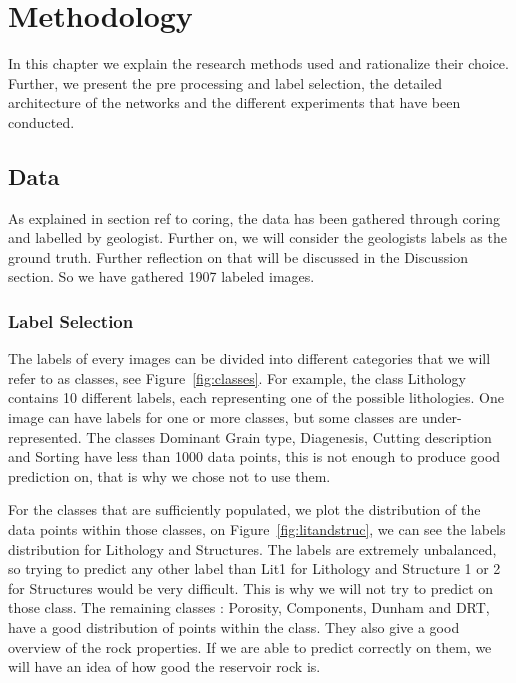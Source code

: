 \chapter{Methodology}\label{chp:methodology}
In this chapter we explain the research methods used and rationalize their choice. Further, we present the pre processing and label selection, the detailed architecture of the networks and the different experiments that have been conducted. 
\section{Data}

As explained in section ref to coring, the data has been gathered through coring and labelled by geologist. Further on, we will consider the geologists labels as the ground truth. Further reflection on that will be discussed in the Discussion section. So we have gathered 1907 labeled images. 
\subsection{Label Selection}
 The labels of every images can be divided into different categories that we will refer to as classes, see Figure~\ref{fig:classes}. For example, the class Lithology contains 10 different labels, each representing one of the possible lithologies. One image can have labels for one or more classes, but some classes are under-represented. The classes Dominant Grain type, Diagenesis, Cutting description and Sorting have less than 1000 data points, this is not enough to produce good prediction on, that is why we chose not to use them.
 
 For the classes that are sufficiently populated, we plot the distribution of the data points within those classes, on Figure~\ref{fig:litandstruc}, we can see the labels distribution for Lithology and Structures. The labels are extremely unbalanced, so trying to predict any other label than Lit1 for Lithology and Structure 1 or 2 for Structures would be very difficult. This is why we will not try to predict on those class. 
 The remaining classes : Porosity, Components, Dunham and DRT, have a good distribution of points within the class. They also give a good overview of the rock properties. If we are able to predict correctly on them, we will have an idea of how good the reservoir rock is. 

